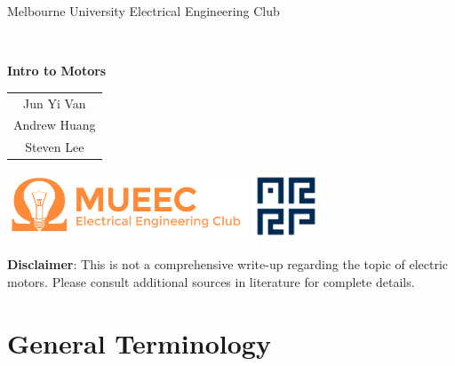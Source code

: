\documentclass[paper=a4, fontsize=11pt]{article} %
\numberwithin{equation}{section} %
\numberwithin{figure}{section} %
\numberwithin{table}{section} %
\begin{document}

\begin{titlepage}
	\begin{center}
		\begin{LARGE}
			Melbourne University Electrical Engineering Club\\
		\end{LARGE}
		\hrulefill\\
		\vfill
		\begin{Huge}
			\textbf{Intro to Motors} \\
		\end{Huge}
		\begin{large}
			\vfill
			
			\begin{tabular}{c}
				Jun Yi Van\\
				Andrew Huang\\
				Steven Lee
			\end{tabular}
		\end{large}
	\end{center}
	\vfill
	\begin{minipage}{\linewidth}
		\includegraphics[height=2cm]{./mueec_logo.png}
		\hfill
		\includegraphics[height=2cm]{./arrp_logo.png}
	\end{minipage}
\end{titlepage}

\newpage

\pagestyle{fancy} %
\textbf{Disclaimer}: This is not a comprehensive write-up regarding the
topic of electric motors. Please consult additional sources in
literature for complete details.

\hypertarget{general-terminology}{%
\section{General Terminology}\label{general-terminology}}
\end{document}
